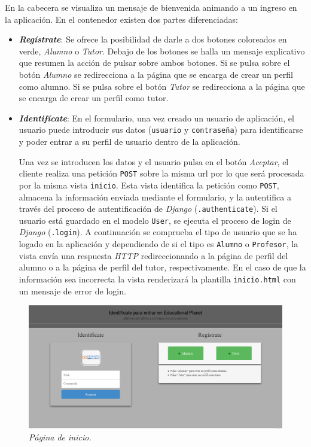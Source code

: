 \documentclass[a4paper, 12pt]{book}
\begin{document}
En la cabecera se visualiza un mensaje de bienvenida animando a un ingreso en la aplicaci\'on. En el contenedor existen dos partes diferenciadas: 
\begin{itemize}
  \item {\bfseries \textit{Reg\'istrate}}: Se ofrece la posibilidad de darle a dos botones coloreados en verde, \textit{Alumno} o \textit{Tutor}. Debajo 
  de los botones se halla un mensaje explicativo que resumen la acci\'on de pulsar sobre ambos botones. Si se pulsa sobre el bot\'on \textit{Alumno} se 
  redirecciona a la p\'agina que se encarga de crear un perfil como alumno. Si se pulsa sobre el bot\'on \textit{Tutor} se redirecciona a la p\'agina que 
  se encarga de crear un perfil como tutor.
  \item {\bfseries \textit{Identif\'icate}}: En el formulario, una vez creado un usuario de aplicaci\'on, el usuario puede introducir sus datos 
  (\texttt{usuario} y \texttt{contrase\~na}) para identificarse y poder entrar a su perfil de usuario dentro de la aplicaci\'on. 
  
  Una vez se introducen los datos y el usuario pulsa en el bot\'on \textit{Aceptar}, el cliente realiza una petici\'on \texttt{POST} sobre la misma url 
  por lo que ser\'a procesada por la misma vista \texttt{inicio}. Esta vista identifica la petici\'on como \texttt{POST}, almacena la informaci\'on enviada
  mediante el formulario, y la autentifica a trav\'es del proceso de autentificaci\'on de \textit{Django} (\texttt{.authenticate}). Si el usuario est\'a 
  guardado en el modelo \texttt{User}, se ejecuta el proceso de login de \textit{Django} (\texttt{.login}). A continuaci\'on se comprueba el tipo de usuario
  que se ha logado en la aplicaci\'on y dependiendo de si el tipo es \texttt{Alumno} o \texttt{Profesor}, la vista env\'ia una respuesta \textit{HTTP} 
  redireccionando a la p\'agina de perfil del alumno o a la p\'agina de perfil del tutor, respectivamente. En el caso de que la informaci\'on sea incorrecta 
  la vista renderizar\'a la plantilla \texttt{inicio.html} con un mensaje de error de login.
\end{itemize}

\begin{figure}
  \centering
  \includegraphics[width=17cm, keepaspectratio]{imagenes/PaginaInicio}
  \caption{\textit{P\'agina de inicio.}}
  \label{fig:paginainicio}
\end{figure}
\end{document}
